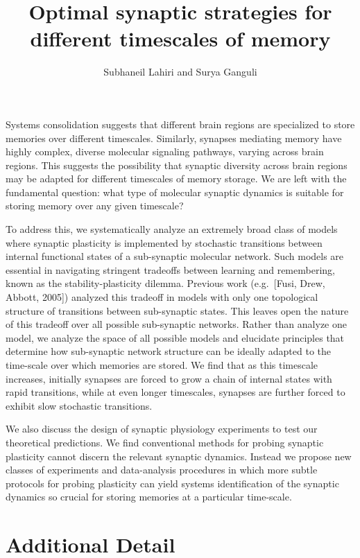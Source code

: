 \documentclass[12pt]{article}
\title{Optimal synaptic strategies for different timescales of memory}
\author{Subhaneil Lahiri and Surya Ganguli}
\date{}
\begin{document}
\pagestyle{empty}
\maketitle
\thispagestyle{empty}


Systems consolidation suggests that different brain regions are specialized to store memories over different timescales. Similarly, synapses mediating memory have highly complex, diverse molecular signaling pathways, varying across brain regions. This suggests the possibility that synaptic diversity across brain regions may be adapted for different timescales of memory storage. We are left with the fundamental question: what type of molecular synaptic dynamics is suitable for storing memory over any given timescale?

To address this, we systematically analyze an extremely broad class of models where synaptic plasticity is implemented by stochastic transitions between internal functional states of a sub-synaptic molecular network. Such models are essential in navigating stringent tradeoffs between learning and remembering, known as the stability-plasticity dilemma. Previous work (e.g.\ [Fusi, Drew, Abbott, 2005]) analyzed this tradeoff in models with only one topological structure of transitions between sub-synaptic states. This leaves open the nature of this tradeoff over all possible sub-synaptic networks. Rather than analyze one model, we analyze the space of all possible models and elucidate principles that determine how sub-synaptic network structure can be ideally adapted to the time-scale over which memories are stored. We find that as this timescale increases, initially synapses are forced to grow a chain of internal states with rapid transitions, while at even longer timescales, synapses are further forced to exhibit slow stochastic transitions.

We also discuss the design of synaptic physiology experiments to test our theoretical predictions. We find conventional methods for probing synaptic plasticity cannot discern the relevant synaptic dynamics. Instead we propose new classes of experiments and data-analysis procedures in which more subtle protocols for probing plasticity can yield systems identification of the synaptic dynamics so crucial for storing memories at a particular time-scale.

\section*{Additional Detail}
\end{document}
